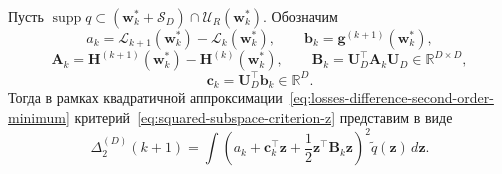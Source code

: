 \begin{lemma}
    \label{lemma:squared-subspace-general-reduction}
    Пусть $\operatorname{supp} q \subset (\mathbf w_k^* + \mathcal S_D)\cap \mathcal U_R(\mathbf w_k^*)$. Обозначим
    \begin{equation}
        a_k
        =
        \mathcal L_{k+1}(\mathbf w_k^*)
        -
        \mathcal L_k(\mathbf w_k^*),
        \qquad
        \mathbf b_k
        =
        \mathbf g^{(k+1)}(\mathbf w_k^*),
    \end{equation}
    \begin{equation}
        \mathbf A_k
        =
        \mathbf H^{(k+1)}(\mathbf w_k^*)
        -
        \mathbf H^{(k)}(\mathbf w_k^*),
        \qquad
        \mathbf B_k
        =
        \mathbf U_D^\top \mathbf A_k \mathbf U_D \in \mathbb R^{D\times D},
    \end{equation}
    \begin{equation}
        \mathbf c_k
        =
        \mathbf U_D^\top \mathbf b_k \in \mathbb R^D.
    \end{equation}
    Тогда в рамках квадратичной аппроксимации~\eqref{eq:losses-difference-second-order-minimum} критерий~\eqref{eq:squared-subspace-criterion-z} представим в виде
    \begin{equation}
        \label{eq:squared-subspace-general-reduction}
        \Delta_{2}^{(D)}(k+1)
        =
        \int
        \left(
            a_k
            +
            \mathbf c_k^\top \mathbf z
            +
            \frac12 \mathbf z^\top \mathbf B_k \mathbf z
        \right)^2
        \tilde q(\mathbf z)\, d\mathbf z.
    \end{equation}
\end{lemma}

